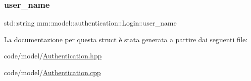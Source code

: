 \subsubsection{\texorpdfstring{user\+\_\+name}{user\_name}}
{\footnotesize\ttfamily std\+::string mm\+::model\+::authentication\+::\+Login\+::user\+\_\+name}



La documentazione per questa struct è stata generata a partire dai seguenti file\+:\begin{DoxyCompactItemize}
\item 
code/model/\hyperlink{_authentication_8hpp}{Authentication.\+hpp}\item 
code/model/\hyperlink{_authentication_8cpp}{Authentication.\+cpp}\end{DoxyCompactItemize}
